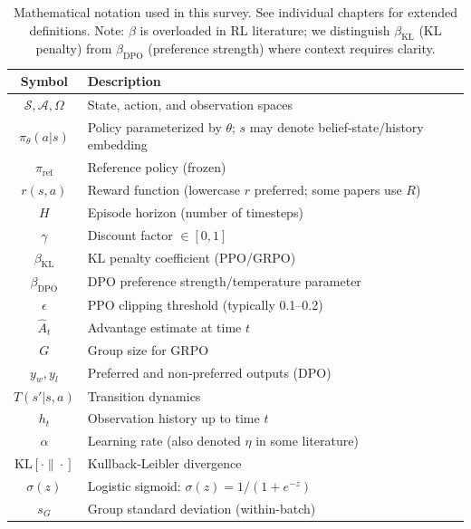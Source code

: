 \documentclass[12pt,a4paper]{report}
\theoremstyle{definition}
\begin{document}
\begin{table}[h]
\centering
\begin{tabular}{@{}cl@{}}
\toprule
\textbf{Symbol} & \textbf{Description} \\
\midrule
$\mathcal{S}, \mathcal{A}, \Omega$ & State, action, and observation spaces \\
$\pi_\theta(a|s)$ & Policy parameterized by $\theta$; $s$ may denote belief-state/history embedding \\
$\pi_{\text{ref}}$ & Reference policy (frozen) \\
$r(s,a)$ & Reward function (lowercase $r$ preferred; some papers use $R$) \\
$H$ & Episode horizon (number of timesteps) \\
$\gamma$ & Discount factor $\in [0,1]$ \\
$\beta_{\text{KL}}$ & KL penalty coefficient (PPO/GRPO) \\
$\beta_{\text{DPO}}$ & DPO preference strength/temperature parameter \\
$\epsilon$ & PPO clipping threshold (typically 0.1--0.2) \\
$\hat{A}_t$ & Advantage estimate at time $t$ \\
$G$ & Group size for GRPO \\
$y_w, y_l$ & Preferred and non-preferred outputs (DPO) \\
$T(s'|s,a)$ & Transition dynamics \\
$h_t$ & Observation history up to time $t$ \\
$\alpha$ & Learning rate (also denoted $\eta$ in some literature) \\
$\text{KL}[\cdot\|\cdot]$ & Kullback-Leibler divergence \\
$\sigma(z)$ & Logistic sigmoid: $\sigma(z) = 1/(1+e^{-z})$ \\
$s_G$ & Group standard deviation (within-batch) \\
\bottomrule
\end{tabular}
\caption{Mathematical notation used in this survey. See individual chapters for extended definitions. Note: $\beta$ is overloaded in RL literature; we distinguish $\beta_{\text{KL}}$ (KL penalty) from $\beta_{\text{DPO}}$ (preference strength) where context requires clarity.}
\label{tab:notation}
\end{table}

\clearpage
{}




\end{document}

